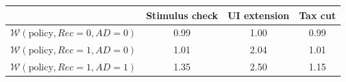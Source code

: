 \begin{tabular}{@{}lccc@{}} 
\toprule 
                          & Stimulus check      & UI extension    & Tax cut    \\  \midrule 
$\mathcal{W}(\text{policy}, Rec=0, AD=0)$ & 0.99   & 1.00   & 0.99    \\ 
$\mathcal{W}(\text{policy}, Rec=1, AD=0)$ & 1.01   & 2.04   & 1.01    \\ 
$\mathcal{W}(\text{policy}, Rec=1, AD=1)$ & 1.35   & 2.50   & 1.15    \\ \bottomrule 
\end{tabular}  
